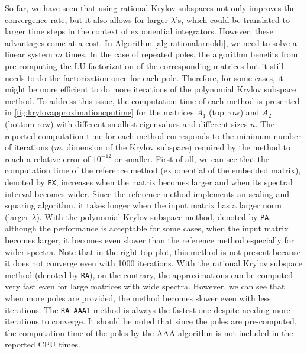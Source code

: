 So far, we have seen that using rational Krylov subspaces not only improves the convergence rate,
but it also allows for larger $\lambda$'s, which could be translated to larger time steps in
the context of exponential integrators.
However, these advantages come at a cost. In Algorithm \ref{alg:rationalarnoldi}, we need to
solve a linear system $m$ times. In the case of repeated poles, the algorithm benefits from pre-computing
the LU factorization of the corresponding matrices but it still needs to do the factorization
once for each pole. Therefore, for some cases, it might be more efficient to do more iterations
of the polynomial Krylov subspace method.
To address this issue, the computation time of each method is presented in
\autoref{fig:krylovapproximationcputime} for the matrices $A_1$ (top row) and $A_2$
(bottom row) with different smallest eigenvalues and different sizes $n$.
The reported computation time for each method corresponds to the minimum number of
iterations ($m$, dimension of the Krylov subspace) required by the method to reach
a relative error of $10^{-12}$ or smaller.
First of all, we can see that the computation time of the reference method (exponential of the
embedded matrix), denoted by \texttt{EX}, increases when the matrix becomes larger and when
its spectral interval becomes wider. Since the reference method implements an scaling and squaring
algorithm, it takes longer when the input matrix has a larger norm (larger $\lambda$).
With the polynomial Krylov subspace method, denoted by \texttt{PA}, although the performance
is acceptable for some cases, when the input matrix becomes larger, it becomes even slower than
the reference method especially for wider spectra. Note that in the right top plot,
this method is not present because it does not converge even with 1000 iterations.
With the rational Krylov subspace method (denoted by \texttt{RA}), on the contrary,
the approximations can be computed very fast even for large matrices with wide spectra.
However, we can see that when more poles are provided, the method becomes slower even
with less iterations. The \texttt{RA-AAA1} method is always the fastest one despite
needing more iterations to converge.
It should be noted that since the poles are pre-computed, the computation time of
the poles by the AAA algorithm is not included in the reported CPU times.

